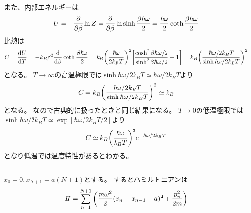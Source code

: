 \documentclass[../../sp_2015.tex]{subfiles}
\begin{document}
また、内部エネルギーは
\begin{equation}\begin{aligned}[b]
    U = -\pdv{\beta}\ln Z
    = \pdv{\beta} \ln\sinh\frac{\beta\hbar\omega}{2}
    =\frac{\hbar\omega}{2}\coth\frac{\beta\hbar\omega}{2}
\end{aligned}\end{equation}
比熱は
\begin{equation}\begin{aligned}[b]
    C = \dv{U}{T}
    = -k_B\beta^2\dv{\beta}\coth\frac{\beta\hbar\omega}{2}
    = k_B\qty(\frac{\hbar\omega}{2k_BT})^2\qty[\frac{\cosh^2\beta\hbar\omega/2}{\sinh^2\beta\hbar\omega/2}-1]
    = k_B \qty(\frac{\hbar\omega/2k_BT}{\sinh\hbar\omega/2k_BT})^2
\end{aligned}\end{equation}
となる。
\(T\to\infty\)の高温極限では\(\sinh\hbar\omega/2k_BT\simeq\hbar\omega/2k_BT\)より
\begin{equation}\begin{aligned}[b]
    C = k_B \qty(\frac{\hbar\omega/2k_BT}{\sinh\hbar\omega/2k_BT})^2\simeq k_B
\end{aligned}\end{equation}
となる。
なので古典的に扱ったときと同じ結果になる。
\(T\to0\)の低温極限では\(\sinh\hbar\omega/2k_BT\simeq \exp[\hbar\omega/2k_BT/2]\)より
\begin{equation}\begin{aligned}[b]
    C \simeq k_B \qty(\frac{\hbar\omega}{k_BT})^2e^{-\hbar\omega/2k_BT}
\end{aligned}\end{equation}
となり低温では温度特性があるとわかる。

\subsection{}
\(x_0 = 0,x_{N+1}=a(N+1)\)とする。
するとハミルトニアンは
\begin{equation}\begin{aligned}[b]
    H = \sum_{n=1}^{N+1}\qty(\frac{m\omega^2}{2}(x_n-x_{n-1}-a)^2+\frac{p_n^2}{2m})
\end{aligned}\end{equation}
\end{document}
